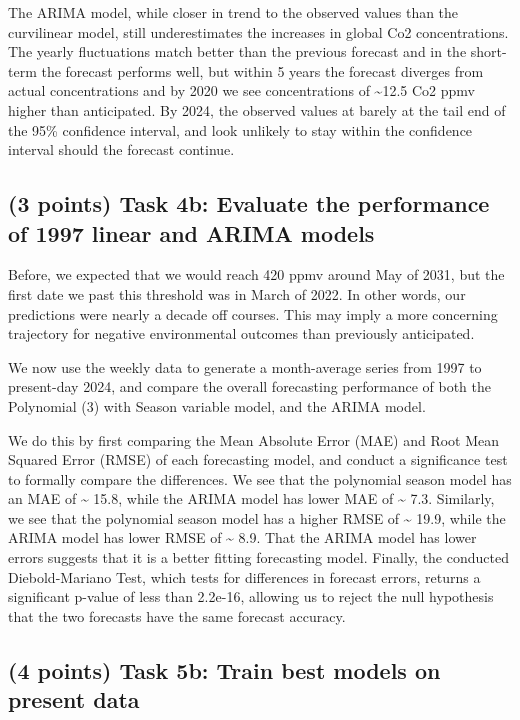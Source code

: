 \documentclass[
]{article}
\begin{document}
The ARIMA model, while closer in trend to the observed values than the curvilinear model, still underestimates the increases in global Co2 concentrations. The yearly fluctuations match better than the previous forecast and in the short-term the forecast performs well, but within 5 years the forecast diverges from actual concentrations and by 2020 we see concentrations of \textasciitilde12.5 Co2 ppmv higher than anticipated. By 2024, the observed values at barely at the tail end of the 95\% confidence interval, and look unlikely to stay within the confidence interval should the forecast continue.

\subsection{(3 points) Task 4b: Evaluate the performance of 1997 linear and ARIMA models}\label{points-task-4b-evaluate-the-performance-of-1997-linear-and-arima-models}

Before, we expected that we would reach 420 ppmv around May of 2031, but the first date we past this threshold was in March of 2022. In other words, our predictions were nearly a decade off courses. This may imply a more concerning trajectory for negative environmental outcomes than previously anticipated.

We now use the weekly data to generate a month-average series from 1997 to present-day 2024, and compare the overall forecasting performance of both the Polynomial (3) with Season variable model, and the ARIMA model.

We do this by first comparing the Mean Absolute Error (MAE) and Root Mean Squared Error (RMSE) of each forecasting model, and conduct a significance test to formally compare the differences. We see that the polynomial season model has an MAE of \textasciitilde{} 15.8, while the ARIMA model has lower MAE of \textasciitilde{} 7.3. Similarly, we see that the polynomial season model has a higher RMSE of \textasciitilde{} 19.9, while the ARIMA model has lower RMSE of \textasciitilde{} 8.9. That the ARIMA model has lower errors suggests that it is a better fitting forecasting model. Finally, the conducted Diebold-Mariano Test, which tests for differences in forecast errors, returns a significant p-value of less than 2.2e-16, allowing us to reject the null hypothesis that the two forecasts have the same forecast accuracy.

\subsection{(4 points) Task 5b: Train best models on present data}\label{points-task-5b-train-best-models-on-present-data}
\end{document}
